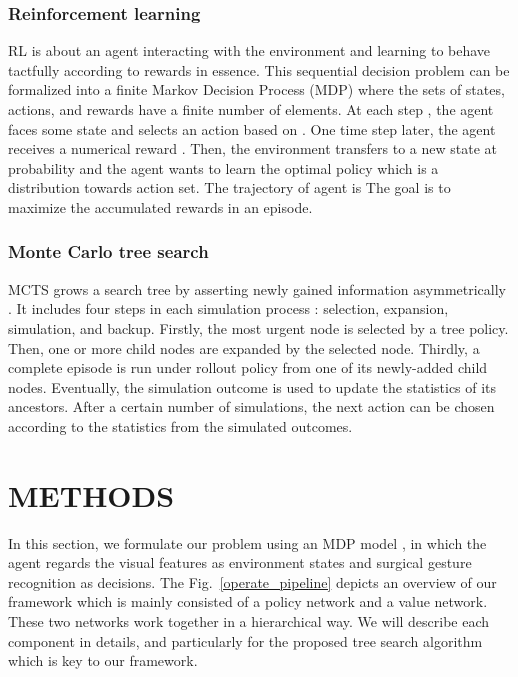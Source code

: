 \documentclass[letterpaper, 10 pt, conference]{ieeeconf}
\begin{document}
\subsubsection{Reinforcement learning} RL is about an agent interacting with the environment and learning to behave tactfully according to rewards in essence. This sequential decision problem can be formalized into a finite Markov Decision Process (MDP) \cite{sutton2018reinforcement} where the sets of states, actions, and rewards have a finite number of elements. At each step , the agent faces some state  and selects an action  based on . One time step later, the agent receives a numerical reward . Then, the environment transfers to a new state  at probability  and the agent wants to learn the optimal policy  which is a distribution towards action set. The trajectory of agent is  The goal is to maximize the accumulated rewards in an episode.

\subsubsection{Monte Carlo tree search} MCTS grows a search tree by asserting newly gained information asymmetrically \cite{browne2012survey}. It includes four steps in each simulation process \cite{coulom2006efficient}: selection, expansion, simulation, and backup. Firstly, the most urgent node is selected by a tree policy. Then, one or more child nodes are expanded by the selected node. Thirdly, a complete episode is run under rollout policy from one of its newly-added child nodes. Eventually, the simulation outcome is used to update the statistics of its ancestors. After a certain number of simulations, the next action can be chosen according to the statistics from the simulated outcomes.	

\section{METHODS}
\label{METHODS}

In this section, we formulate our problem using an MDP model \cite{liu2018deep}, in which the agent regards the visual features as environment states and 
surgical gesture recognition as decisions.
The Fig.~\ref{operate_pipeline} depicts an overview of our framework which is mainly consisted of a policy network and a value network. These two networks work together in a hierarchical way. We will describe each component in details, and particularly for the proposed tree search algorithm which is key to our framework.
\end{document}

